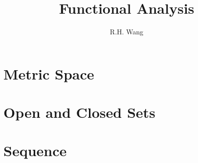 \documentclass[UTF8,12pt,AutoFakeBold]{ctexart}
\title{Functional Analysis}
\author{R.H. Wang}
\date{}
\numberwithin{equation}{section}%
\begin{document}
	\kaishu
	\maketitle
	
	\vspace{1cm}
	\tableofcontents
	
	\newpage
	\kaishu
	\section{Metric Space}
	
	\section{Open and Closed Sets}

	\section{Sequence}
	
	
	
	
	
	\newpage
		

	
\end{document}
